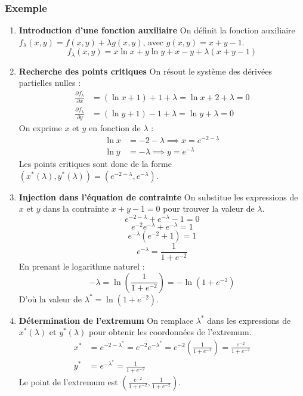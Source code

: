 \documentclass[french]{yLectureNote}
\begin{document}
\subsubsection{Exemple}
\begin{enumerate}
    \item \textbf{Introduction d'une fonction auxiliaire}
    On définit la fonction auxiliaire $f_{\lambda}(x, y) = f(x, y) + \lambda g(x, y)$, avec $g(x, y) = x+y-1$.
    $$ f_{\lambda}(x, y) = x \ln x + y \ln y + x - y + \lambda(x + y - 1) $$

    \item \textbf{Recherche des points critiques}
    On résout le système des dérivées partielles nulles :
    \begin{align*}
    \frac{\partial f_{\lambda}}{\partial x} &= (\ln x + 1) + 1 + \lambda = \ln x + 2 + \lambda = 0 \\
    \frac{\partial f_{\lambda}}{\partial y} &= (\ln y + 1) - 1 + \lambda = \ln y + \lambda = 0
    \end{align*}
    On exprime $x$ et $y$ en fonction de $\lambda$ :
    \begin{align*}
    \ln x &= -2 - \lambda \implies x = e^{-2 - \lambda} \\
    \ln y &= -\lambda \implies y = e^{-\lambda}
    \end{align*}
    Les points critiques sont donc de la forme $(x^*(\lambda), y^*(\lambda)) = (e^{-2-\lambda}, e^{-\lambda})$.

    \item \textbf{Injection dans l'équation de contrainte}
    On substitue les expressions de $x$ et $y$ dans la contrainte $x + y - 1 = 0$ pour trouver la valeur de $\lambda$.
    $$ e^{-2 - \lambda} + e^{-\lambda} - 1 = 0 $$
    $$ e^{-2}e^{-\lambda} + e^{-\lambda} = 1 $$
    $$ e^{-\lambda}(e^{-2} + 1) = 1 $$
    $$ e^{-\lambda} = \frac{1}{1 + e^{-2}} $$
    En prenant le logarithme naturel :
    $$ -\lambda = \ln\left(\frac{1}{1 + e^{-2}}\right) = -\ln(1 + e^{-2}) $$
    D'où la valeur de $\lambda^* = \ln(1 + e^{-2})$.

    \item \textbf{Détermination de l'extremum}
    On remplace $\lambda^*$ dans les expressions de $x^*(\lambda)$ et $y^*(\lambda)$ pour obtenir les coordonnées de l'extremum.
    \begin{align*}
    x^* &= e^{-2 - \lambda^*} = e^{-2}e^{-\lambda^*} = e^{-2} \left(\frac{1}{1 + e^{-2}}\right) = \frac{e^{-2}}{1 + e^{-2}} \\
    y^* &= e^{-\lambda^*} = \frac{1}{1 + e^{-2}}
    \end{align*}
    Le point de l'extremum est $\left( \frac{e^{-2}}{1 + e^{-2}}, \frac{1}{1 + e^{-2}} \right)$.
\end{enumerate}
 
\end{document}
